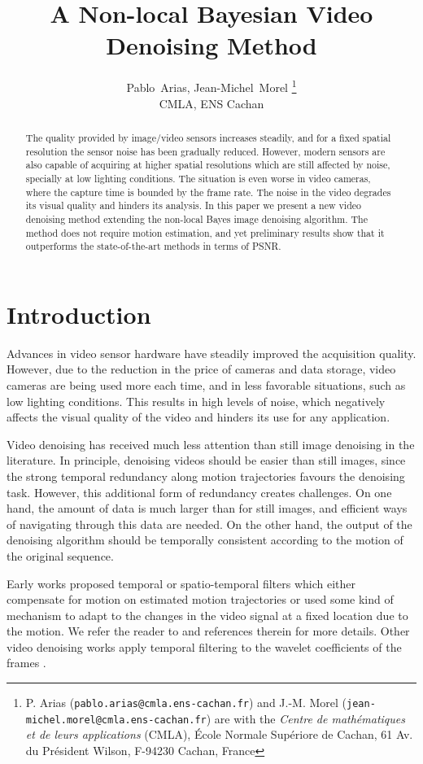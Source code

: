 \documentclass[10pt, a4paper]{article}
\title{A Non-local Bayesian Video Denoising Method}
\date{}
\author{Pablo~Arias, Jean-Michel~Morel%
\thanks{P. Arias (\texttt{pablo.arias@cmla.ens-cachan.fr}) and J.-M. Morel
(\texttt{jean-michel.morel@cmla.ens-cachan.fr}) are with the \emph{Centre de
math\'ematiques et de leurs applications} (CMLA), \'Ecole Normale Sup\'eriore
de Cachan, 61 Av. du Pr\'esident Wilson, F-94230 Cachan, France}
\\[1ex] CMLA, ENS Cachan}
\newcommand{\pcomment}[1]{}
\begin{document}
\maketitle              %

\begin{abstract}
	The quality provided by image/video sensors increases steadily, and
	for a fixed spatial resolution the sensor noise has been gradually reduced.
	However, modern sensors are also capable of acquiring at higher spatial
	resolutions which are still affected by noise, specially at low lighting
	conditions. The situation is even worse in video cameras, where the capture
	time is bounded by the frame rate. The noise in the video degrades its visual 
	quality and hinders its analysis.
	In this paper we present a new video denoising method extending 
	the non-local Bayes image denoising algorithm. The method does not require 
	motion estimation, and yet preliminary results show that it outperforms the
	state-of-the-art methods in terms of PSNR.
\end{abstract}

%
\section{Introduction}
%

Advances in video sensor hardware have steadily improved the acquisition
quality. However, due to the reduction in the price of cameras
and data storage, video cameras are being used more each time, and in less
favorable situations, such as low lighting conditions. This results in high 
levels of noise, which negatively affects the visual quality of the video and
hinders its use for any application. 
\pcomment{It would be nice to have some reference for these claims about
sensors, camera prices, etc.}

Video denoising has received much less attention than still image denoising in
the literature.  In principle, denoising videos should be easier than still
images, since the strong temporal redundancy along motion trajectories favours
the denoising task. However, this additional form of redundancy creates
challenges.  On one hand, the amount of data is much larger than for still
images, and efficient ways of navigating through this data are needed. On the
other hand, the output of the denoising algorithm should be temporally
consistent according to the motion of the original sequence.

Early works proposed temporal or spatio-temporal filters which either compensate
for motion on estimated motion trajectories or used some kind of mechanism to
adapt to the changes in the video signal at a fixed location due to the motion.
We refer the reader to \cite{Brailean1995a} and references therein for more details.
Other video denoising works apply temporal filtering to the wavelet coefficients 
of the frames \cite{Jin2006,Zlokolica2006a}. 
\end{document}
